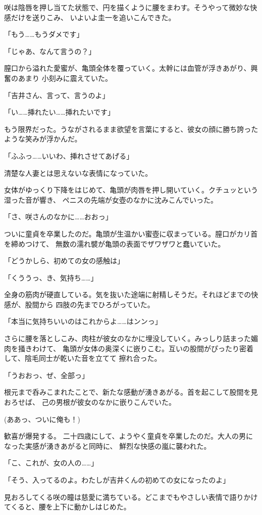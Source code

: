 ﻿\documentclass[
    book,tate,
    line_length=30zw,
    jafontsize=12pt,
    paper=b5j,
    landscape,
    ]{jlreq}
\begin{document}
咲は陰唇を押し当てた状態で、円を描くように腰をまわす。そうやって微妙な快感だけを送りこみ、
いよいよ圭一を追いこんできた。

「もう……もうダメです」

「じゃあ、なんて言うの？」

膣口から溢れた愛蜜が、亀頭全体を覆っていく。太幹には血管が浮きあがり、興奮のあまり
小刻みに震えていた。

「吉井さん、言って、言うのよ」

「い……挿れたい……挿れたいです」

もう限界だった。うながされるまま欲望を言葉にすると、彼女の顔に勝ち誇ったような笑みが浮かんだ。

「ふふっ……いいわ、挿れさせてあげる」

清楚な人妻とは思えないな表情になっていた。

女体がゆっくり下降をはじめて、亀頭が肉唇を押し開いていく。クチュッという湿った音が響き、
ペニスの先端が女壺のなかに沈みこんでいった。

「さ、咲さんのなかに……おおっ」

ついに童貞を卒業したのだ。亀頭が生温かい蜜壺に収まっている。膣口がカリ首を締めつけて、
無数の濡れ襞が亀頭の表面でザワザワと蠢いていた。

「どうかしら、初めての女の感触は」

「くううっ、き、気持ち……」

全身の筋肉が硬直している。気を抜いた途端に射精しそうだ。それほどまでの快感が、股間から
四肢の先までひろがっていた。

「本当に気持ちいいのはこれからよ……はンンっ」

さらに腰を落としこみ、肉柱が彼女のなかに埋没していく。みっしり詰まった媚肉を掻きわけて、
亀頭が女体の奥深くに嵌りこむ。互いの股間がぴったり密着して、陰毛同士が乾いた音を立てて
擦れ合った。

「うおおっ、ぜ、全部っ」

根元まで呑みこまれたことで、新たな感動が湧きあがる。首を起こして股間を見おろせば、
己の男根が彼女のなかに嵌りこんでいた。

(ああっ、ついに俺も！)

歓喜が爆発する。 二十四歳にして、ようやく童貞を卒業したのだ。大人の男になった実感が湧きあがると同時に、
鮮烈な快感の嵐に襲われた。

「こ、これが、女の人の……」

「そう、入ってるのよ。わたしが吉井くんの初めての女になったのよ」

見おろしてくる咲の瞳は慈愛に満ちている。どこまでもやさしい表情で語りかけてくると、腰を上下に動かしはじめた。
\end{document}
